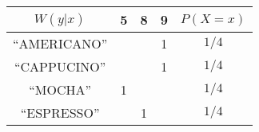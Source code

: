 \begin{tabular}{c|c|c|c||c|}
$W(y|x)$          & 5 & 8 & 9 & $P(X = x)$\\
\hline
“AMERICANO” &   &  & 1  & $1/4$ \\
\hline
“CAPPUCINO” &   &   & 1  & $1/4$\\
\hline
“MOCHA”     & 1 &   &    & $1/4$\\
\hline
“ESPRESSO”  &   &  1  &   & $1/4$\\
\hline
\end{tabular}
